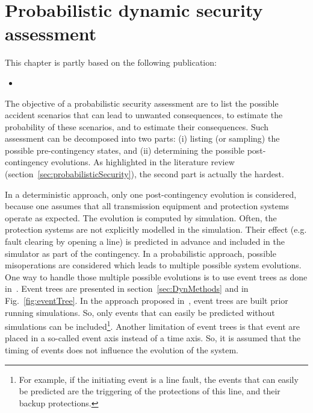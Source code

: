 \chapter{Probabilistic dynamic security assessment}
\label{ch:DPSA}

This chapter is partly based on the following publication:
\begin{itemize}
    \item {}
\end{itemize}




The objective of a probabilistic security assessment are to list the possible accident scenarios that can lead to unwanted consequences, to estimate the probability of these scenarios, and to estimate their consequences. Such assessment can be decomposed into two parts: (i) listing (or sampling) the possible pre-contingency states, and (ii) determining the possible post-contingency evolutions. As highlighted in the literature review (section~\ref{sec:probabilisticSecurity}), the second part is actually the hardest.

In a deterministic approach, only one post-contingency evolution is considered, because one assumes that all transmission equipment and protection systems operate as expected. The evolution is computed by simulation. Often, the protection systems are not explicitly modelled in the simulation. Their effect (e.g. fault clearing by opening a line) is predicted in advance and included in the simulator as part of the contingency. In a probabilistic approach, possible misoperations are considered which leads to multiple possible system evolutions. One way to handle those multiple possible evolutions is to use event trees as done in~\cite{Haarla, GridPSA}. Event trees are presented in section~\ref{sec:DynMethods} and in Fig.~\ref{fig:eventTree}. In the approach proposed in~\cite{Haarla, GridPSA}, event trees are built prior running simulations. So, only events that can easily be predicted without simulations can be included\footnote{For example, if the initiating event is a line fault, the events that can easily be predicted are the triggering of the protections of this line, and their backup protections.}. Another limitation of event trees is that event are placed in a so-called event axis instead of a time axis. So, it is assumed that the timing of events does not influence the evolution of the system.

